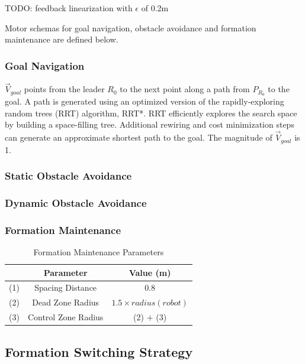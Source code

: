 \documentclass[letterpaper, 10 pt, conference]{ieeeconf}  %
\begin{document}
TODO: feedback linearization with $\epsilon$ of 0.2m

Motor schemas for goal navigation, obstacle avoidance and formation maintenance are defined below.

\subsubsection*{Goal Navigation}

$\vec{V}_{goal}$ points from the leader $R_0$ to the next point along a path from $P_{R_0}$ to the goal. A path is generated using an optimized version of the rapidly-exploring random trees (RRT) algorithm, RRT*. RRT efficiently explores the search space by building a space-filling tree. Additional rewiring and cost minimization steps can generate an approximate shortest path to the goal. The magnitude of $\vec{V}_{goal}$ is 1.

\subsubsection*{Static Obstacle Avoidance}

\subsubsection*{Dynamic Obstacle Avoidance}

\subsubsection*{Formation Maintenance}

\begin{table}[h]
\begin{center}
\begin{tabular}{|c|c|c|}
\hline
 & Parameter & Value (m) \\
\hline
(1) & Spacing Distance            & 0.8 \\
(2) & Dead Zone Radius          & $1.5 \times radius(robot)$ \\
(3) & Control Zone Radius        & (2) $+$ (3) \\
\hline
\end{tabular}
\end{center}
\caption{Formation Maintenance Parameters}
\label{table_formation}
\end{table}

\subsection{Formation Switching Strategy}
\end{document}

